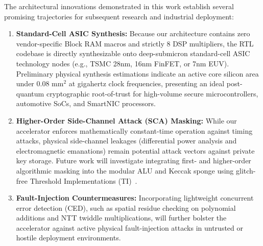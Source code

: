 The architectural innovations demonstrated in this work establish several promising trajectories for subsequent research and industrial deployment:
\begin{enumerate}
    \item \textbf{Standard-Cell ASIC Synthesis:} Because our architecture contains zero vendor-specific Block RAM macros and strictly 8 DSP multipliers, the RTL codebase is directly synthesizable onto deep-submicron standard-cell ASIC technology nodes (e.g., TSMC 28nm, 16nm FinFET, or 7nm EUV). Preliminary physical synthesis estimations indicate an active core silicon area under \textbf{$0.08\text{ mm}^2$} at gigahertz clock frequencies, presenting an ideal post-quantum cryptographic root-of-trust for high-volume secure microcontrollers, automotive SoCs, and SmartNIC processors.
    \item \textbf{Higher-Order Side-Channel Attack (SCA) Masking:} While our accelerator enforces mathematically constant-time operation against timing attacks, physical side-channel leakages (differential power analysis and electromagnetic emanations) remain potential attack vectors against private key storage. Future work will investigate integrating first- and higher-order algorithmic masking into the modular ALU and Keccak sponge using glitch-free Threshold Implementations (TI)~\cite{nikova2006}.
    \item \textbf{Fault-Injection Countermeasures:} Incorporating lightweight concurrent error detection (CED), such as spatial residue checking on polynomial additions and NTT twiddle multiplications, will further bolster the accelerator against active physical fault-injection attacks in untrusted or hostile deployment environments.
\end{enumerate}
